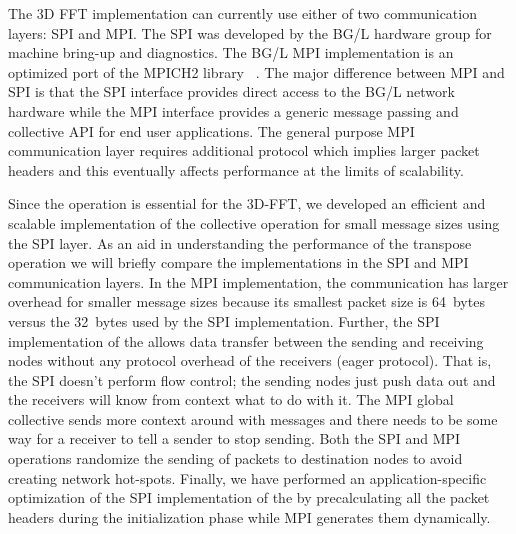 The 3D FFT implementation can currently use either of two
communication layers: SPI and MPI.  The SPI was developed by the BG/L
hardware group for machine bring-up and diagnostics.  The BG/L MPI
implementation is an optimized port of the MPICH2
library ~\cite{Almasi2005, almasi_opt:2005}. The major difference between MPI and SPI is
that the SPI interface provides direct access to the BG/L
network hardware while the MPI interface provides a generic message
passing and collective API for end user applications. The general
purpose MPI communication layer requires additional protocol which
implies larger packet headers and this eventually affects performance
at the limits of scalability.

Since the \alltoall operation is essential for the 3D-FFT, we developed
an efficient and scalable implementation of the \alltoall collective
operation for small message sizes using the SPI layer.  As an aid in
understanding the performance of the transpose operation we will
briefly compare the \alltoall implementations in the SPI and MPI
communication layers.  In the MPI implementation, the \alltoall
communication has larger overhead for smaller message sizes because
its smallest packet size is 64~bytes versus the 32~bytes used by the
SPI implementation. Further, the SPI implementation of the \alltoall
allows data transfer between the sending and receiving nodes without
any protocol overhead of the receivers (eager protocol). That is, the SPI \alltoall
doesn't perform flow control; the sending nodes just push data out and
the receivers will know from context what to do with it.  The MPI
\alltoall global collective sends more context around with messages and
there needs to be some way for a receiver to tell a sender to stop
sending. Both the SPI and MPI \alltoall operations randomize the
sending of packets to destination nodes to avoid creating network
hot-spots.  Finally, we have performed an application-specific
optimization of the SPI implementation of the \alltoall by
precalculating all the packet headers during the initialization phase
while MPI generates them dynamically.




  
